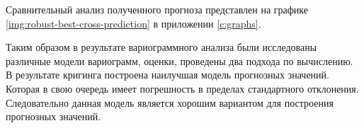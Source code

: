 Сравнительный анализ полученного прогноза представлен на графике \ref{img:robust-best-cross-prediction} в приложении \ref{c:graphs}.

Таким образом в результате вариограммного анализа были исследованы различные модели вариограмм, оценки, проведены два подхода по вычислению. В результате кригинга построена наилучшая модель прогнозных значений. Которая в свою очередь имеет погрешность в пределах стандартного отклонения. Следовательно данная модель является хорошим вариантом для построения прогнозных значений.


